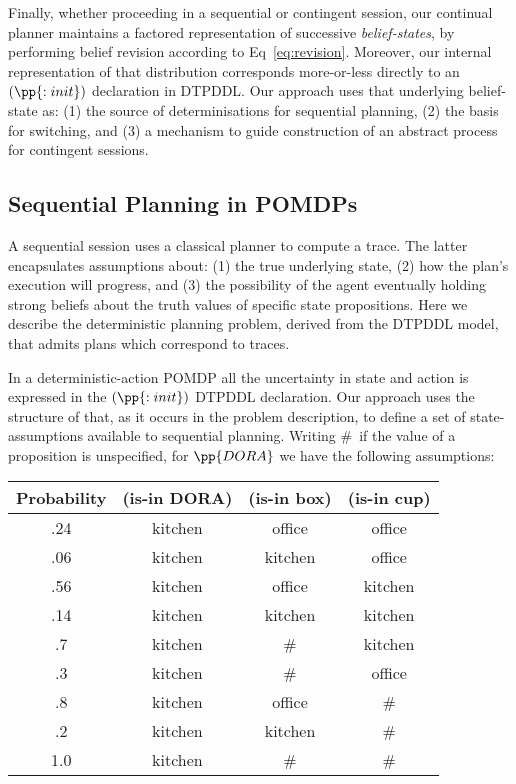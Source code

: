 Finally, whether proceeding in a sequential or contingent session, our
continual planner maintains a factored representation of successive
{\em belief-states}, by performing belief revision according to
Eq~\ref{eq:revision}. Moreover, our internal representation of that
distribution corresponds more-or-less directly to an $(\pp{:init})$
declaration in DTPDDL. Our approach uses that underlying belief-state
as: (1) the source of determinisations for sequential planning, (2)
the basis for switching, and (3) a mechanism to guide construction of
an abstract process for contingent sessions.



\subsection{Sequential Planning in POMDPs}

A sequential session uses a classical planner to compute a trace. The
latter encapsulates assumptions about: (1) the true underlying state,
(2) how the plan's execution will progress, and (3) the possibility of
the agent eventually holding strong beliefs about the truth values of
specific state propositions. Here we describe the deterministic
planning problem, derived from the DTPDDL model, that admits plans
which correspond to traces.

In a deterministic-action POMDP all the uncertainty in state and
action is expressed in the $(\pp{:init})$ DTPDDL declaration. Our
approach uses the structure of that, as it occurs in the problem
description, to define a set of state-assumptions available to
sequential planning.
Writing \#\ if the value of a proposition is unspecified, for
$\pp{DORA}$ we have the following assumptions:

\small
\begin{tabular}{cccc}
\hline
Probability & (is-in DORA)  & (is-in box)  & (is-in cup) \\
\hline
.24 & kitchen & office & office \\
.06 & kitchen & kitchen & office \\
.56 & kitchen & office & kitchen \\
.14 & kitchen & kitchen & kitchen \\
.7 & kitchen & \# &  kitchen\\
.3 & kitchen & \# & office \\
.8 & kitchen & office & \# \\
.2 & kitchen & kitchen & \# \\
1.0 & kitchen & \# & \# \\
\hline
\end{tabular}
\normalsize

